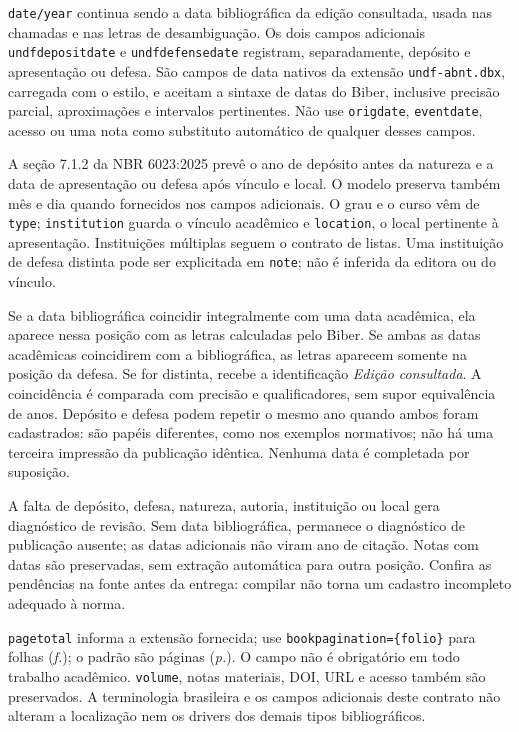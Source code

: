 \texttt{date/year} continua sendo a data bibliográfica da edição consultada,
usada nas chamadas e nas letras de desambiguação. Os dois campos adicionais
\texttt{undfdepositdate} e \texttt{undfdefensedate} registram, separadamente,
depósito e apresentação ou defesa. São campos de data nativos da extensão
\texttt{undf-abnt.dbx}, carregada com o estilo, e aceitam a sintaxe de datas
do Biber, inclusive precisão parcial, aproximações e intervalos pertinentes.
Não use \texttt{origdate}, \texttt{eventdate}, acesso ou uma nota como
substituto automático de qualquer desses campos.

A seção 7.1.2 da NBR 6023:2025 prevê o ano de depósito antes da natureza e
a data de apresentação ou defesa após vínculo e local. O modelo preserva
também mês e dia quando fornecidos nos campos adicionais. O grau e o curso
vêm de \texttt{type}; \texttt{institution} guarda o vínculo acadêmico e
\texttt{location}, o local pertinente à apresentação. Instituições múltiplas
seguem o contrato de listas. Uma instituição de defesa distinta pode ser
explicitada em \texttt{note}; não é inferida da editora ou do vínculo.

Se a data bibliográfica coincidir integralmente com uma data acadêmica,
ela aparece nessa posição com as letras calculadas pelo Biber. Se ambas as datas acadêmicas coincidirem com a bibliográfica, as letras
aparecem somente na posição da defesa. Se for
distinta, recebe a identificação \emph{Edição consultada}. A coincidência
é comparada com precisão e qualificadores, sem supor equivalência de anos.
Depósito e defesa podem repetir o mesmo ano quando ambos foram cadastrados:
são papéis diferentes, como nos exemplos normativos; não há uma terceira
impressão da publicação idêntica. Nenhuma data é completada por suposição.

A falta de depósito, defesa, natureza, autoria, instituição ou local gera
diagnóstico de revisão. Sem data bibliográfica, permanece o diagnóstico
de publicação ausente; as datas adicionais não viram ano de citação.
Notas com datas são preservadas, sem extração automática para outra posição.
Confira as pendências na fonte antes da entrega: compilar não torna um
cadastro incompleto adequado à norma.

\texttt{pagetotal} informa a extensão fornecida; use
\verb|bookpagination={folio}| para folhas (\emph{f.}); o padrão são páginas
(\emph{p.}). O campo não é obrigatório em todo trabalho acadêmico.
\texttt{volume}, notas materiais, DOI, URL e acesso também são preservados.
A terminologia brasileira e os campos adicionais deste contrato não alteram
a localização nem os drivers dos demais tipos bibliográficos.


